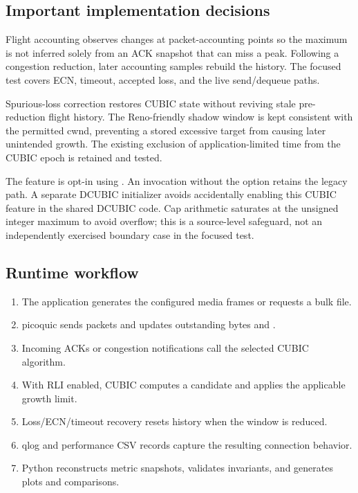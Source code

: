 \documentclass[11pt,a4paper]{article}
\newcommand{\code}[1]{\texttt{\detokenize{#1}}}
\begin{document}
\subsection{Important implementation decisions}
Flight accounting observes changes at packet-accounting points so the
maximum is not inferred solely from an ACK snapshot that can miss a peak.
Following a congestion reduction, later accounting samples rebuild the
history. The focused test covers ECN, timeout, accepted loss, and the live
send/dequeue paths.

Spurious-loss correction restores CUBIC state without reviving stale
pre-reduction flight history. The Reno-friendly shadow window is kept
consistent with the permitted cwnd, preventing a stored excessive target
from causing later unintended growth. The existing exclusion of
application-limited time from the CUBIC epoch is retained and tested.

The feature is opt-in using \code{-G cubic -H rli=on}. An invocation without
the option retains the legacy path. A separate DCUBIC initializer avoids
accidentally enabling this CUBIC feature in the shared DCUBIC code. Cap
arithmetic saturates at the unsigned integer maximum to avoid overflow;
this is a source-level safeguard, not an independently exercised boundary
case in the focused test.

\subsection{Runtime workflow}
\begin{enumerate}
\item The application generates the configured media frames or requests a bulk file.
\item picoquic sends packets and updates outstanding bytes and \code{maxFS}.
\item Incoming ACKs or congestion notifications call the selected CUBIC algorithm.
\item With RLI enabled, CUBIC computes a candidate and applies the applicable growth limit.
\item Loss/ECN/timeout recovery resets history when the window is reduced.
\item qlog and performance CSV records capture the resulting connection behavior.
\item Python reconstructs metric snapshots, validates invariants, and generates plots and comparisons.
\end{enumerate}
\end{document}
